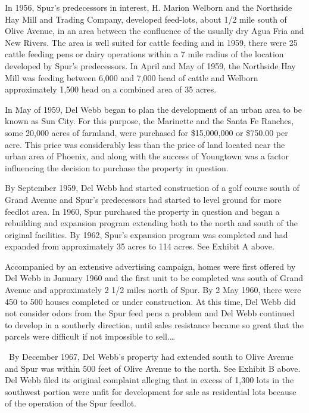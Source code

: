 In 1956, Spur's predecessors in interest, H. Marion Welborn and the Northside
Hay Mill and Trading Company, developed feed-lots, about 1/2 mile south of Olive
Avenue, in an area between the confluence of the usually dry Agua Fria and New
Rivers. The area is well suited for cattle feeding and in 1959, there were 25
cattle feeding pens or dairy operations within a 7 mile radius of the location
developed by Spur's predecessors. In April and May of 1959, the Northside Hay
Mill was feeding between 6,000 and 7,000 head of cattle and Welborn
approximately 1,500 head on a combined area of 35 acres.

In May of 1959, Del Webb began to plan the development of an urban area to be
known as Sun City. For this purpose, the Marinette and the Santa Fe Ranches,
some 20,000 acres of farmland, were purchased for \$15,000,000 or \$750.00 per
acre. This price was considerably less than the price of land located near the
urban area of Phoenix, and along with the success of Youngtown was a factor
influencing the decision to purchase the property in question.

By September 1959, Del Webb had started construction of a golf course south of
Grand Avenue and Spur's predecessors had started to level ground for more
feedlot area. In 1960, Spur purchased the property in question and began a
rebuilding and expansion program extending both to the north and south of the
original facilities. By 1962, Spur's expansion program was completed and had
expanded from approximately 35 acres to 114 acres. See Exhibit A above.

Accompanied by an extensive advertising campaign, homes were first offered by
Del Webb in January 1960 and the first unit to be completed was south of Grand
Avenue and approximately 2 1/2 miles north of Spur. By 2 May 1960, there were
450 to 500 houses completed or under construction. At this time, Del Webb did
not consider odors from the Spur feed pens a problem and Del Webb continued to
develop in a southerly direction, until sales resistance became so great that
the parcels were difficult if not impossible to sell.\ldots

~By December 1967, Del Webb's property had extended south to Olive Avenue and
Spur was within 500 feet of Olive Avenue to the north. See Exhibit B above. Del
Webb filed its original complaint alleging that in excess of 1,300 lots in the
southwest portion were unfit for development for sale as residential lots
because of the operation of the Spur feedlot.

